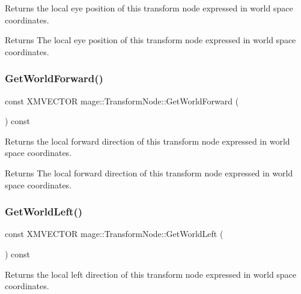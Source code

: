 Returns the local eye position of this transform node expressed in world space coordinates.

\begin{DoxyReturn}{Returns}
The local eye position of this transform node expressed in world space coordinates. 
\end{DoxyReturn}
\hypertarget{structmage_1_1_transform_node_a4737be175d69768d353f500636502296}{}\label{structmage_1_1_transform_node_a4737be175d69768d353f500636502296} 
\subsubsection{\texorpdfstring{Get\+World\+Forward()}{GetWorldForward()}}
{\footnotesize\ttfamily const X\+M\+V\+E\+C\+T\+OR mage\+::\+Transform\+Node\+::\+Get\+World\+Forward (\begin{DoxyParamCaption}{ }\end{DoxyParamCaption}) const\hspace{0.3cm}{\ttfamily [noexcept]}}

Returns the local forward direction of this transform node expressed in world space coordinates.

\begin{DoxyReturn}{Returns}
The local forward direction of this transform node expressed in world space coordinates. 
\end{DoxyReturn}
\hypertarget{structmage_1_1_transform_node_af021782ea162e0aa8c891b794d204632}{}\label{structmage_1_1_transform_node_af021782ea162e0aa8c891b794d204632} 
\subsubsection{\texorpdfstring{Get\+World\+Left()}{GetWorldLeft()}}
{\footnotesize\ttfamily const X\+M\+V\+E\+C\+T\+OR mage\+::\+Transform\+Node\+::\+Get\+World\+Left (\begin{DoxyParamCaption}{ }\end{DoxyParamCaption}) const\hspace{0.3cm}{\ttfamily [noexcept]}}

Returns the local left direction of this transform node expressed in world space coordinates.

